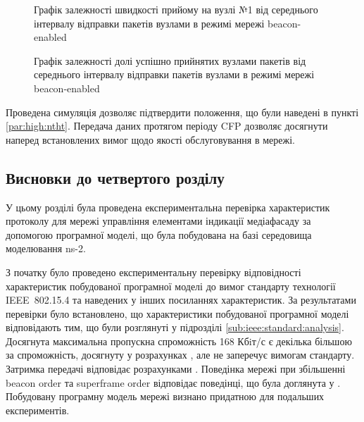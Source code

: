 \documentclass[a4paper,ukrainian,utf8,nocolumnsxix,nocolumnxxxii,nocolumnxxxi,floatsection,equationsection]{eskdtext}
\newcommand{\longcaption}[1]{\captionsetup{style=figureLongCaption}\caption{#1}}
\newcommand{\iee}[0]{IEEE~802.15.4\xspace}
\newcommand{\bem}[0]{beacon-enabled\xspace}
\begin{document}
\begin{figure}[bp]
	\centering
	\longcaption{\label{fig:result_test_backtraf_beac_brd_tp1}Графік залежності швидкості прийому на вузлі №1 від середнього інтервалу відправки пакетів вузлами в режимі мережі \bem}
\end{figure}

\begin{figure}[htbp]
	\centering
	\longcaption{\label{fig:result_test_backtraf_beac_brd_deliv}Графік залежності долі успішно прийнятих вузлами пакетів від середнього інтервалу відправки пакетів вузлами в режимі мережі \bem}
\end{figure}


Проведена симуляція дозволяє підтвердити положення, що були наведені в пункті \ref{par:high:ntht}. Передача даних протягом періоду CFP дозволяє досягнути наперед встановлених вимог щодо якості обслуговування в мережі. 

\subsection{Висновки до  четвертого розділу}

У цьому розділі була проведена експериментальна перевірка характеристик протоколу для мережі управління елементами індикації медіафасаду за допомогою програмної моделі, що була побудована на базі середовища моделювання ns-2.

З початку було проведено експериментальну перевірку відповідності характеристик побудованої програмної моделі до вимог стандарту технології \iee та наведених у інших посиланнях характеристик. За результатами перевірки було встановлено, що характеристики побудованої програмної моделі відповідають тим, що були розглянуті у підрозділі \ref{sub:ieee:standard:analysis}. Досягнута максимальна пропускна спроможність  168 Кбiт/с є декілька більшою за спроможність, досягнуту у розрахунках \cite{thoroughput:analysis:unslotted:ieee}, але не заперечує вимогам стандарту. Затримка передачі відповідає розрахунками \cite{thoroughput:analysis:unslotted:ieee}. Поведінка мережі при збільшенні beacon order та superframe order відповідає поведінці, що була доглянута у \cite{simulation:study:slotted:ieee}. Побудовану програмну модель мережі визнано придатною для подальших експериментів.
\end{document}
